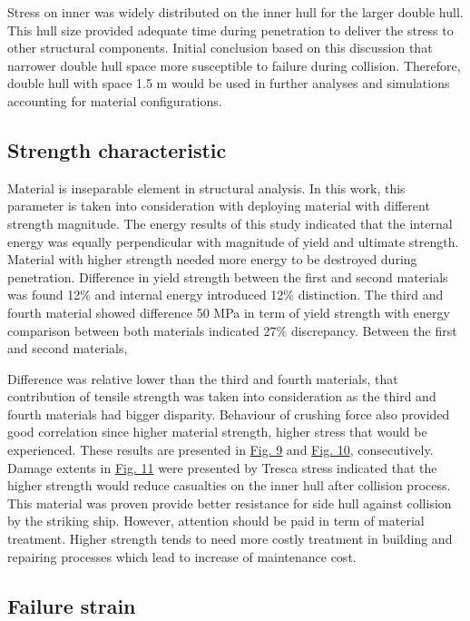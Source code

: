 \documentclass[../Final.tex]{subfiles}
\begin{document}
Stress on inner was widely distributed on the inner hull for the larger double hull. This hull size provided adequate time during penetration to deliver the stress to other structural components. 
Initial conclusion based on this discussion that narrower double hull space more susceptible to failure during collision. 
Therefore, double hull with space 1.5 m would be used in further analyses and simulations accounting for material configurations. 

\subsection{Strength characteristic}

Material is inseparable element in structural analysis. In this work, this parameter is taken into consideration with deploying material with different strength magnitude. 
The energy results of this study indicated that the internal energy was equally perpendicular with magnitude of yield and ultimate strength. 
Material with higher strength needed more energy to be destroyed during penetration. Difference in yield strength between the first and second materials was found 12\% and internal energy introduced 12\% distinction. 
The third and fourth material showed difference 50 MPa in term of yield strength with energy comparison between both materials indicated 27\% discrepancy. Between the first and second materials, 

Difference was relative lower than the third and fourth materials, that contribution of tensile strength was taken into consideration as the third and fourth materials had bigger disparity. 
Behaviour of crushing force also provided good correlation since higher material strength, higher stress that would be experienced. These results are presented in \hyperref[fig9]{Fig. 9} and \hyperref[fig10]{Fig. 10}, consecutively. 
Damage extents in \hyperref[fig11]{Fig. 11} were presented by Tresca stress indicated that the higher strength would reduce casualties on the inner hull after collision process. 
This material was proven provide better resistance for side hull against collision by the striking ship. However, attention should be paid in term of material treatment. 
Higher strength tends to need more costly treatment in building and repairing processes which lead to increase of maintenance cost. 

\subsection{Failure strain}
\end{document}
